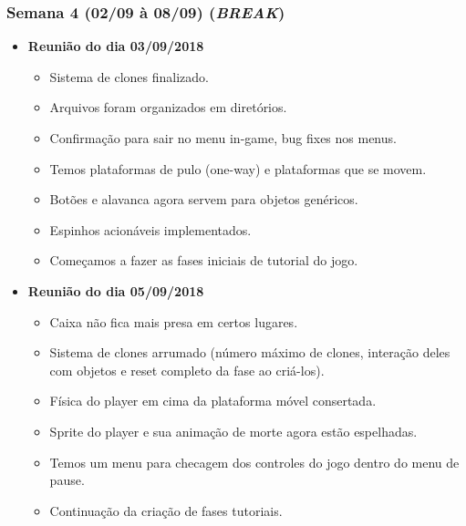 \documentclass[a4paper, 11pt]{article}
\begin{document}
\subsubsection{Semana 4 (02/09 à 08/09) (\textit{BREAK})}
	\begin{itemize} 
		\item \textbf{Reunião do dia 03/09/2018}

		\begin{itemize}
    		
    		\item Sistema de clones finalizado.
    		\item Arquivos foram organizados em diretórios.
    		\item Confirmação para sair no menu in-game, bug fixes nos menus.
    		\item Temos plataformas de pulo (one-way) e plataformas que se movem.
    		\item Botões e alavanca agora servem para objetos genéricos.
    		\item Espinhos acionáveis implementados.
    		\item Começamos a fazer as fases iniciais de tutorial do jogo.

   		\end{itemize}

		\item \textbf{Reunião do dia 05/09/2018}

		\begin{itemize}
    		
    		\item Caixa não fica mais presa em certos lugares.
    		\item Sistema de clones arrumado (número máximo de clones, interação deles com objetos e reset completo da fase ao criá-los).
    		\item Física do player em cima da plataforma móvel consertada.
    		\item Sprite do player e sua animação de morte agora estão espelhadas.
    		\item Temos um menu para checagem dos controles do jogo dentro do menu de pause.
    		\item Continuação da criação de fases tutoriais.

		\end{itemize}

	\end{itemize}
\end{document}
